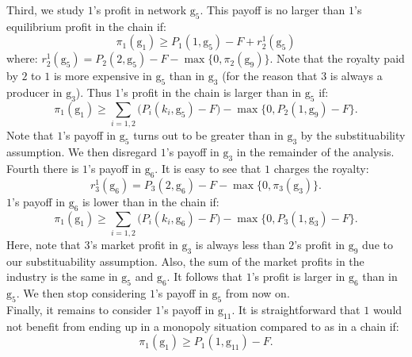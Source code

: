 \documentclass{article}
\begin{document}
\indent Third, we study $1$'s profit in network $\text{g}_5$. This payoff is no larger than $1$'s equilibrium profit in the chain if: 
\begin{equation*}
    \pi_1(\text{g}_1) \geq P_1(1,\text{g}_5) -F +r^1_2(\text{g}_5)
\end{equation*}
where: $r^1_2(\text{g}_5)= P_2(2,\text{g}_5)-F - \max\{0, \pi_2(\text{g}_9)\}$. Note that the royalty paid by $2$ to $1$ is more expensive in $\text{g}_5$ than in $\text{g}_3$ (for the reason that $3$ is always a producer in $\text{g}_3$). Thus $1$'s profit in the chain is larger than in $\text{g}_5$ if: 
\begin{equation*}
    \pi_1(\text{g}_1) \geq \sum_{i=1,2} \big(P_i(k_i,\text{g}_5) -F \big) -\max\{0,P_2(1,\text{g}_9)-F\}. 
\end{equation*}
Note that $1$'s payoff in $\text{g}_5$ turns out to be greater than in $\text{g}_3$ by the substituability assumption. We then disregard $1$'s payoff in $\text{g}_3$ in the remainder of the analysis. \\

\indent Fourth there is $1$'s payoff in $\text{g}_6$. It is easy to see that $1$ charges the royalty: 
\begin{equation*}
    r^1_3(\text{g}_6)= P_3(2,\text{g}_6)-F - \max\{0, \pi_3(\text{g}_3)\}. 
\end{equation*}
$1$'s payoff in $\text{g}_6$ is lower than in the chain if: 
\begin{equation}
    \pi_1(\text{g}_1)\geq \sum_{i=1,2} \big(P_i(k_i,\text{g}_6)-F\big) -\max\{0, P_3(1,\text{g}_3)-F\}.\label{dev2} 
\end{equation}
Here, note that $3$'s market profit in $\text{g}_3$ is always less than $2$'s profit in $\text{g}_9$ due to our substituability assumption. Also, the sum of the market profits in the industry is the same in $\text{g}_5$ and $\text{g}_6$. It follows that $1$'s profit is larger in $\text{g}_6$ than in $\text{g}_5$. We then stop considering $1$'s payoff in $\text{g}_5$ from now on. \\

\indent Finally, it remains to consider $1$'s payoff in $\text{g}_{11}$. It is straightforward that $1$ would not benefit from ending up in a monopoly situation compared to as in a chain if:
\begin{equation}
    \pi_1(\text{g}_1)\geq P_1(1,\text{g}_{11}) - F. 
\end{equation}
\end{document}
